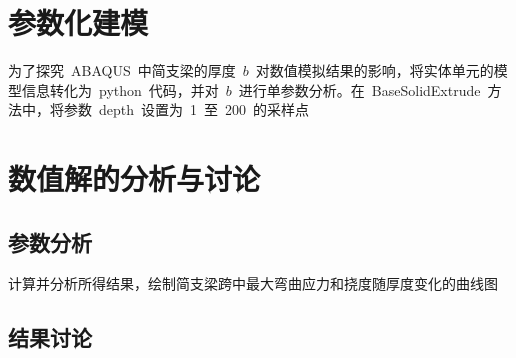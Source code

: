 \section{参数化建模}
为了探究~ABAQUS~中简支梁的厚度~$b$~对数值模拟结果的影响，将实体单元的模型信息转化为~python~代码，并对~$b$~进行单参数分析。在~BaseSolidExtrude~方法中，将参数~depth~设置为~1~至~200~的采样点
\section{数值解的分析与讨论}
\subsection{参数分析}
计算并分析所得结果，绘制简支梁跨中最大弯曲应力和挠度随厚度变化的曲线图
\subsection{结果讨论}